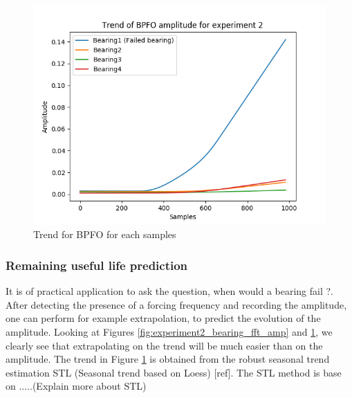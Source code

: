 \documentclass[../Main/thesis.tex]{subfiles}
\begin{document}
\begin{figure}[H] 
   \centering
   \includegraphics[width=4.4in]{../fig/experiment2_bearing_fft_trend.png} 
   \caption{Trend for BPFO for each samples}
   \label{fig:experiment2_bearing_fft_trend}
\end{figure}
\clearpage
\subsubsection{Remaining useful life prediction}
It is of practical application to ask the question, when would a bearing fail ?. After detecting the presence of a forcing frequency and recording the amplitude, one can perform for example extrapolation, to predict the evolution of the amplitude. Looking at Figures  \ref{fig:experiment2_bearing_fft_amp}  and \ref{fig:experiment2_bearing_fft_trend}, we clearly see that extrapolating on the trend will be much easier than on the amplitude. The trend in Figure  \ref{fig:experiment2_bearing_fft_trend} is obtained from the robust seasonal trend estimation STL (Seasonal trend based on Loess) [ref].
\justify
The STL method is base on .....(Explain more about STL)

























\blankpage
\end{document}
